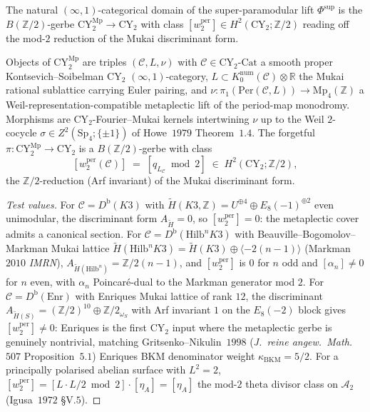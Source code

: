 The natural $(\infty, 1)$-categorical domain of the super-paramodular lift $\Phi^{\mathrm{sup}}$ is the $B(\mathbb{Z}/2)$-gerbe $\mathrm{CY}_2^{\mathrm{Mp}} \to \mathrm{CY}_2$ with class $[w_2^{\mathrm{per}}] \in H^2(\mathrm{CY}_2; \mathbb{Z}/2)$ reading off the mod-$2$ reduction of the Mukai discriminant form.

\begin{proposition}
\label{prop:k3e-CY2Mp-gerbe}
Objects of $\mathrm{CY}_2^{\mathrm{Mp}}$ are triples $(\mathcal{C}, L, \nu)$ with $\mathcal{C} \in \mathrm{CY}_2\text{-}\mathrm{Cat}$ a smooth proper Kontsevich--Soibelman CY$_2$ $(\infty, 1)$-category, $L \subset K_0^{\mathrm{num}}(\mathcal{C}) \otimes \mathbb{R}$ the Mukai rational sublattice carrying Euler pairing, and $\nu: \pi_1(\mathrm{Per}(\mathcal{C}, L)) \to \mathrm{Mp}_4(\mathbb{Z})$ a Weil-representation-compatible metaplectic lift of the period-map monodromy. Morphisms are CY$_2$-Fourier--Mukai kernels intertwining $\nu$ up to the Weil $2$-cocycle $\sigma \in Z^2(\mathrm{Sp}_4; \{\pm 1\})$ of Howe~$1979$ Theorem~$1.4$. The forgetful $\pi: \mathrm{CY}_2^{\mathrm{Mp}} \to \mathrm{CY}_2$ is a $B(\mathbb{Z}/2)$-gerbe with class
\begin{equation}
\label{eq:k3e-wper-formula}
[w_2^{\mathrm{per}}(\mathcal{C})] \;=\; [q_{L_\mathcal{C}} \bmod 2] \;\in\; H^2(\mathrm{CY}_2; \mathbb{Z}/2),
\end{equation}
the $\mathbb{Z}/2$-reduction (Arf invariant) of the Mukai discriminant form.
\end{proposition}

\begin{proof}[Test values]
For $\mathcal{C} = D^{\mathrm{b}}(K3)$ with $\widetilde H(K3, \mathbb{Z}) = U^{\oplus 4} \oplus E_8(-1)^{\oplus 2}$ even unimodular, the discriminant form $A_{\widetilde H} = 0$, so $[w_2^{\mathrm{per}}] = 0$: the metaplectic cover admits a canonical section. For $\mathcal{C} = D^{\mathrm{b}}(\mathrm{Hilb}^n K3)$ with Beauville--Bogomolov--Markman Mukai lattice $\widetilde H(\mathrm{Hilb}^n K3) = \widetilde H(K3) \oplus \langle -2(n - 1)\rangle$ (Markman~$2010$ \emph{IMRN}), $A_{\widetilde H(\mathrm{Hilb}^n)} = \mathbb{Z}/2(n - 1)$, and $[w_2^{\mathrm{per}}]$ is $0$ for $n$ odd and $[\alpha_n] \neq 0$ for $n$ even, with $\alpha_n$ Poincar\'e-dual to the Markman generator mod $2$. For $\mathcal{C} = D^{\mathrm{b}}(\mathrm{Enr})$ with Enriques Mukai lattice of rank $12$, the discriminant $A_{\widetilde H(S)} = (\mathbb{Z}/2)^{10} \oplus \mathbb{Z}/2_{\omega_S}$ with Arf invariant $1$ on the $E_8(-2)$ block gives $[w_2^{\mathrm{per}}] \neq 0$: Enriques is the first CY$_2$ input where the metaplectic gerbe is genuinely nontrivial, matching Gritsenko--Nikulin~$1998$ (\emph{J.\ reine angew.\ Math.}~$507$ Proposition~$5.1$) Enriques BKM denominator weight $\kappa_{\mathrm{BKM}} = 5/2$. For a principally polarised abelian surface with $L^2 = 2$, $[w_2^{\mathrm{per}}] = [L \cdot L/2 \bmod 2] \cdot [\eta_A] = [\eta_A]$ the mod-$2$ theta divisor class on $\mathcal{A}_2$ (Igusa~$1972$ \S V.$5$).
\end{proof}

